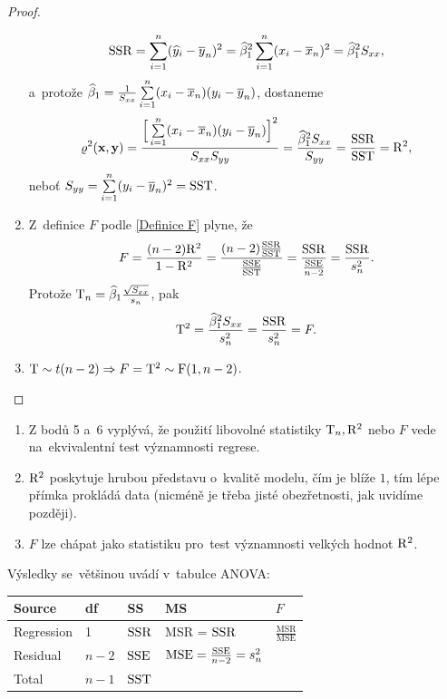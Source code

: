 \begin{theorem}
\begin{proof}
\begin{enumerate}
		$$ \mathrm{SSR} = \sum\limits_{i=1}^{n} (\widehat{y}_i-\overline{y}_n)^2=\widehat{\beta}_1^2\sum\limits_{i=1}^{n} (x_i-\overline{x}_n)^2 = \widehat{\beta}_1^2 S_{xx}, $$
		a~protože $\widehat{\beta}_1 = \frac{1}{S_{xx}}\sum\limits_{i=1}^{n} (x_i-\overline{x}_n)(y_i-\overline{y}_n)$, dostaneme
		 $$ \varrho^2(\textbf{x},\textbf{y}) = \frac{\Big[\sum\limits_{i=1}^{n} (x_i-\overline{x}_n)(y_i-\overline{y}_n)\Big]^2}{S_{xx} S_{yy}} = \frac{\widehat{\beta}_1^2 S_{xx}}{S_{yy}} = \frac{\mathrm{SSR}}{\mathrm{SST}} = \mathrm{R}^2, $$
		 neboť $S_{yy} = \sum\limits_{i=1}^{n} (y_i-\overline{y}_n)^2 = \mathrm{SST}$.
		\item Z~definice $F$ podle \eqref{Definice F} plyne, že
		 $$ F = \frac{(n-2)\mathrm{R}^2}{1-\mathrm{R}^2} = \frac{(n-2)\frac{\mathrm{SSR}}{\mathrm{SST}}}{\frac{\mathrm{SSE}}{\mathrm{SST}}} = \frac{\mathrm{SSR}}{\frac{\mathrm{SSE}}{n-2}} = \frac{\mathrm{SSR}}{s_n^2}. $$ Protože $\mathrm{T}_n = \widehat{\beta}_1\frac{\sqrt{S_{xx}}}{s_n}$, pak $$ \mathrm{T}^2 = \frac{\widehat{\beta}_1^2 S_{xx}}{s_n^2} = \frac{\mathrm{SSR}}{s_n^2} = F. $$
		\item $\mathrm{T}\sim t(n-2) \Rightarrow F = \mathrm{T}^2\sim\mathrm{F}(1,n-2)$.
		
	\end{enumerate}
\end{proof}
\end{theorem}
\begin{remark}
\begin{enumerate}
	\item 	Z bodů 5 a~6 vyplývá, že použití libovolné statistiky $\mathrm{T}_n,\mathrm{R}^2$ nebo $F$ vede na~ekvivalentní test významnosti regrese.
	\item $\mathrm{R}^2$ poskytuje hrubou představu o~kvalitě modelu, čím je blíže $1$, tím lépe přímka prokládá data (nicméně je třeba jisté obezřetnosti, jak uvidíme později).
	\item $F$ lze chápat jako statistiku pro~test významnosti velkých hodnot $\mathrm{R}^2$.
\end{enumerate}
\end{remark}
Výsledky se~většinou uvádí v~tabulce ANOVA:
\begin{table}[h]\label{ANOVA_table}
	\begin{tabular}{|lllll|}
	\hline
	Source & df & SS & MS & $F$\\
	\hline
	Regression & 1 & $\mathrm{SSR}$ & MSR = $\mathrm{SSR}$ & $\frac{\mathrm{MSR}}{\mathrm{MSE}}$ \\
	Residual & $n-2$ & $\mathrm{SSE}$ & $\mathrm{MSE} = \frac{\mathrm{\mathrm{SSE}}}{n-2} = s_n^2$ & \\
	Total & $n-1$ & $\mathrm{SST}$ & & \\ \hline
\end{tabular}
\end{table}

